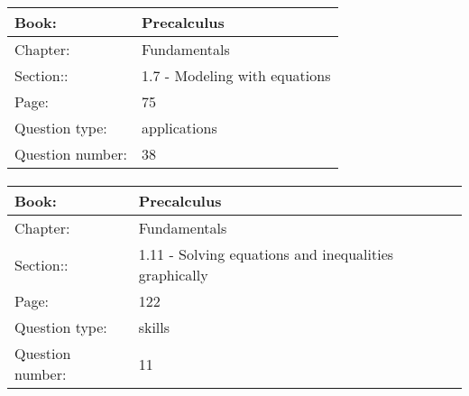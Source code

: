 \documentclass{article}
\begin{document}
            \paragraph{}
            \begin{tabularx}{1\textwidth}{
                    p{}
                    p{}
                }
                \toprule
                Book: & Precalculus
                \\
                \midrule
                Chapter: & Fundamentals
                \\
                \midrule
                Section:: & 1.7 - Modeling with equations
                \\
                \midrule
                Page: & 75
                \\
                \midrule
                Question type: & applications
                \\
                \midrule
                Question number: & 38
                \\
                \bottomrule
            \end{tabularx}
            
            \paragraph{}
            \begin{tabularx}{1\textwidth}{
                    p{}
                    p{}
                }
                \toprule
                Book: & Precalculus
                \\
                \midrule
                Chapter: & Fundamentals
                \\
                \midrule
                Section:: & 1.11 - Solving equations and inequalities graphically
                \\
                \midrule
                Page: & 122
                \\
                \midrule
                Question type: & skills
                \\
                \midrule
                Question number: & 11
                \\
                \bottomrule
            \end{tabularx}
            
\end{document}
